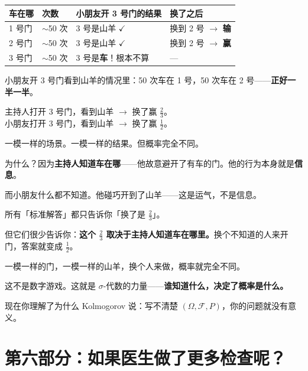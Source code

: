 \documentclass[12pt,a4paper]{article}
\begin{document}
\begin{center}
\renewcommand{\arraystretch}{1.4}
\begin{tabular}{p{2cm}p{1.5cm}p{4cm}p{2.5cm}}
\textbf{车在哪} & \textbf{次数} & \textbf{小朋友开 3 号门的结果} & \textbf{换了之后} \\
\hline
1 号门 & $\sim$50 次 & 3 号是山羊 $\checkmark$ & 换到 2 号 $\rightarrow$ \textbf{输} \\
2 号门 & $\sim$50 次 & 3 号是山羊 $\checkmark$ & 换到 2 号 $\rightarrow$ \textbf{赢} \\
3 号门 & $\sim$50 次 & 3 号是\textbf{车}！根本不算 & — \\
\end{tabular}
\end{center}

小朋友开 3 号门看到山羊的情况里：50 次车在 1 号，50 次车在 2 号——\textbf{正好一半一半}。

\begin{warnbox}
主持人打开 3 号门，看到山羊 $\rightarrow$ 换了赢 $\frac{2}{3}$。\\
小朋友打开 3 号门，看到山羊 $\rightarrow$ 换了赢 $\frac{1}{2}$。

一模一样的场景。一模一样的结果。但概率完全不同。

为什么？因为\textbf{主持人知道车在哪}——他故意避开了有车的门。他的行为本身就是\textbf{信息}。

而小朋友什么都不知道。他碰巧开到了山羊——这是运气，不是信息。
\end{warnbox}

\begin{mathbox}[三门问题真正的教训]
所有「标准解答」都只告诉你「换了是 $\frac{2}{3}$」。

但它们很少告诉你：\textbf{这个 $\frac{2}{3}$ 取决于主持人知道车在哪里。}换个不知道的人来开门，答案就变成 $\frac{1}{2}$。

一模一样的门，一模一样的山羊，换个人来做，概率就完全不同。

这不是数字游戏。这就是 $\sigma$-代数的力量——\textbf{谁知道什么，决定了概率是什么。}

现在你理解了为什么 Kolmogorov 说：写不清楚 $(\Omega, \mathcal{F}, P)$，你的问题就没有意义。
\end{mathbox}

\section*{第六部分：如果医生做了更多检查呢？}
\end{document}
